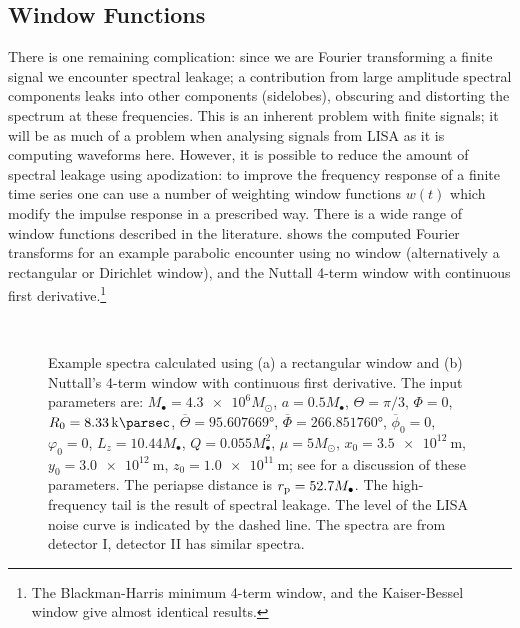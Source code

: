 \subsection{Window Functions}

There is one remaining complication: since we are Fourier transforming a finite signal we encounter spectral leakage; a contribution from large amplitude spectral components leaks into other components (sidelobes), obscuring and distorting the spectrum at these frequencies\cite{Jones1982,Harris1978}. This is an inherent problem with finite signals; it will be as much of a problem when analysing signals from LISA as it is computing waveforms here. However, it is possible to reduce the amount of spectral leakage using apodization: to improve the frequency response of a finite time series one can use a number of weighting window functions $w(t)$ which modify the impulse response in a prescribed way. There is a wide range of window functions described in the literature\cite{Harris1978,Kaiser1980,Nuttall1981}.  shows the computed Fourier transforms for an example parabolic encounter using no window (alternatively a rectangular or Dirichlet window), and the Nuttall 4-term window with continuous first derivative\cite{Nuttall1981}.\footnote{The Blackman-Harris minimum 4-term window\cite{Harris1978, Nuttall1981}, and the Kaiser-Bessel window\cite{Harris1978, Kaiser1980} give almost identical results.}
\begin{figure}[htbp]
  \begin{center}  \quad
{} \\
    \caption{Example spectra calculated using (a) a rectangular window and (b) Nuttall's 4-term window with continuous first derivative\cite{Nuttall1981}. The input parameters are: $M_\bullet = \num{4.3e6} M_\odot$, $a = 0.5 M_\bullet$, $\Theta = \pi/3$, $\Phi = 0$, $R_0 = \SI{8.33}{\kilo\parsec}$, $\overline{\Theta} = \ang{95.607669}$, $\overline{\Phi} = \ang{266.851760}$, $\overline{\phi}_0 = 0$, $\varphi_0 = 0$, $L_z = 10.44 M_\bullet$, $Q = 0.055 M_\bullet^2$, $\mu = 5 M_\odot$, $x_0 = \SI{3.5e12}{\metre}$, $y_0 = \SI{3.0e12}{\metre}$, $z_0 = \SI{1.0e11}{\metre}$; see  for a discussion of these parameters. The periapse distance is $r_\mathrm{p} = 52.7 M_\bullet$. The high-frequency tail is the result of spectral leakage. The level of the LISA noise curve is indicated by the dashed line. The spectra are from detector I, detector II has similar spectra.}
    \label{fig:Window}
  \end{center}
\end{figure}
